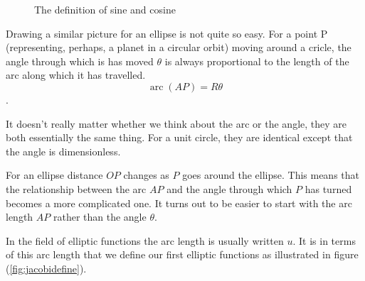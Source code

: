 \documentclass[main.tex]{subfiles}
\begin{document}
\begin{figure}[H]
  \label{fig:eetrigrecall}
  \caption{The definition of sine and cosine}
\end{figure}

Drawing a similar picture for an ellipse is not quite so easy. For a point P (representing, perhaps, a planet in a circular orbit) moving around a cricle, the angle through which is has moved $\theta$ is always proportional to the length of the arc along which it has travelled. $$\mathop{arc}(AP)=R\theta$$.

It doesn't really matter whether we think about the arc or the angle, they are both essentially the same thing. For a unit circle, they are identical except that the angle is dimensionless.

For an ellipse distance $OP$ changes as $P$ goes around the ellipse. This means that the relationship between the arc $AP$ and the angle through which $P$ has turned becomes a more complicated one. It turns out to be easier to start with the arc length $AP$ rather than the angle $\theta$.

In the field of elliptic functions the arc length is usually written $u$. It is in terms of this arc length that we define our first elliptic functions as illustrated in figure (\ref{fig:jacobidefine}).
\end{document}
